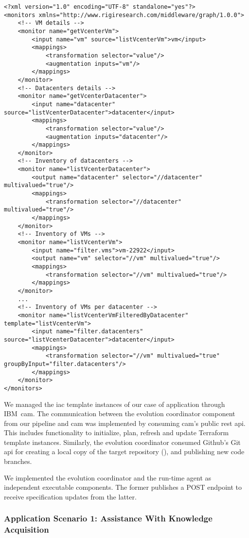 \begin{lstlisting}[style=xml,caption={Historian's configuration file for monitoring VMware resources},label=lst:evaluation--im-vmware-graph-configuration]
<?xml version="1.0" encoding="UTF-8" standalone="yes"?>
<monitors xmlns="http://www.rigiresearch.com/middleware/graph/1.0.0">
	<!-- VM details -->
	<monitor name="getVcenterVm">
		<input name="vm" source="listVcenterVm">vm</input>
		<mappings>
			<transformation selector="value"/>
			<augmentation inputs="vm"/>
		</mappings>
	</monitor>
	<!-- Datacenters details -->
	<monitor name="getVcenterDatacenter">
		<input name="datacenter" source="listVcenterDatacenter">datacenter</input>
		<mappings>
			<transformation selector="value"/>
			<augmentation inputs="datacenter"/>
		</mappings>
	</monitor>
	<!-- Inventory of datacenters -->
	<monitor name="listVcenterDatacenter">
		<output name="datacenter" selector="//datacenter" multivalued="true"/>
		<mappings>
			<transformation selector="//datacenter" multivalued="true"/>
		</mappings>
	</monitor>
	<!-- Inventory of VMs -->
	<monitor name="listVcenterVm">
		<input name="filter.vms">vm-22922</input>
		<output name="vm" selector="//vm" multivalued="true"/>
		<mappings>
			<transformation selector="//vm" multivalued="true"/>
		</mappings>
	</monitor>
	...
	<!-- Inventory of VMs per datacenter -->
	<monitor name="listVcenterVmFilteredByDatacenter" template="listVcenterVm">
		<input name="filter.datacenters" source="listVcenterDatacenter">datacenter</input>
		<mappings>
			<transformation selector="//vm" multivalued="true" groupByInput="filter.datacenters"/>
		</mappings>
	</monitor>
</monitors>
\end{lstlisting}

We managed the \gls{iac} template instances of our case of application through IBM~\gls{cam}. The communication between the evolution coordinator component from our pipeline and \gls{cam} was implemented by consuming \gls{cam}'s public \gls{rest} \gls{api}. This includes functionality to initialize, plan, refresh and update Terraform template instances. Similarly, the evolution coordinator consumed Github's Git \gls{api} for creating a local copy of the target repository (), and publishing new code branches.

We implemented the evolution coordinator and the run-time agent as independent executable components. The former publishes a POST endpoint to receive specification updates from the latter.

\subsubsection{Application Scenario 1: Assistance With Knowledge Acquisition}
\label{subsubsect:evaluation--im-application-scenario-1}

